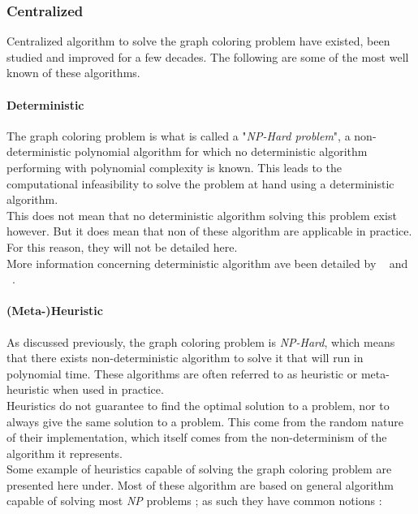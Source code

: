 \documentclass[letterpaper]{article}
\begin{document}
\subsubsection{Centralized}
Centralized algorithm to solve the graph coloring problem have existed, been studied and improved for a few decades. The following are some of the most well known of these algorithms.

\paragraph{Deterministic}
The graph coloring problem is what is called a "\emph{NP-Hard problem}", a non-deterministic polynomial algorithm for which no deterministic algorithm performing with polynomial complexity is known. This leads to the computational infeasibility to solve the problem at hand using a deterministic algorithm.\\

This does not mean that no deterministic algorithm solving this problem exist however. But it does mean that non of these algorithm are applicable in practice. For this reason, they will not be detailed here.\\

More information concerning deterministic algorithm ave been detailed by ~\cite{DeMarco2001FDG} and ~\cite{Barenboim2011DDV}.

\paragraph{(Meta-)Heuristic}
As discussed previously, the graph coloring problem is \emph{NP-Hard}, which means that there exists non-deterministic algorithm to solve it that will run in polynomial time. These algorithms are often referred to as heuristic or meta-heuristic when used in practice.\\

Heuristics do not guarantee to find the optimal solution to a problem, nor to always give the same solution to a problem. This come from the random nature of their implementation, which itself comes from the non-determinism of the algorithm it represents.\\

Some example of heuristics capable of solving the graph coloring problem are presented here under. Most of these algorithm are based on general algorithm capable of solving most \emph{NP} problems ; as such they have common notions :
\end{document}
